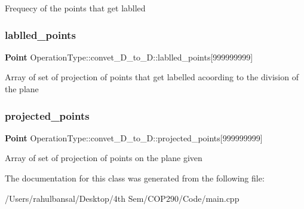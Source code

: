 Frequecy of the points that get lablled \mbox{\label{class_operation_type_1_1convet__3_d__to__2_d_a403633fb764047822340904ab7d15098}} 
\subsubsection{lablled\+\_\+points}
{\footnotesize\ttfamily \textbf{ Point} Operation\+Type\+::convet\+\_\+D\+\_\+to\+\_\+D\+::lablled\+\_\+points[999999999]\hspace{0.3cm}{\ttfamily [private]}}

Array of set of projection of points that get labelled acoording to the division of the plane \mbox{\label{class_operation_type_1_1convet__3_d__to__2_d_aee03aa6559f9d09b36456413b16121e1}} 
\subsubsection{projected\+\_\+points}
{\footnotesize\ttfamily \textbf{ Point} Operation\+Type\+::convet\+\_\+D\+\_\+to\+\_\+D\+::projected\+\_\+points[999999999]\hspace{0.3cm}{\ttfamily [private]}}

Array of set of projection of points on the plane given 

The documentation for this class was generated from the following file\+:\begin{DoxyCompactItemize}
\item 
/\+Users/rahulbansal/\+Desktop/4th Sem/\+C\+O\+P290/\+Code/main.\+cpp\end{DoxyCompactItemize}
